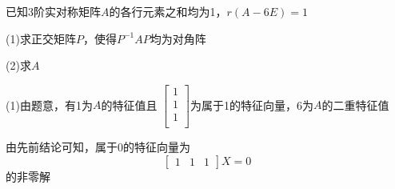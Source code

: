\documentclass[lang=cn,10pt]{elegantbook}
\begin{document}
\begin{example}
	已知3阶实对称矩阵$A $的各行元素之和均为1，$r(A-6E)=1$
	
	(1)求正交矩阵$P$，使得$P^{-1}AP$均为对角阵
	
	(2)求$A$
\end{example}
\begin{solution}
	
	(1)由题意，有1为$A$的特征值且
	$\left[ \begin{array}{c}
		1\\
		1\\
		1\\
	\end{array} \right]$为属于1的特征向量，6为$A$的二重特征值
	
	由先前结论可知，属于0的特征向量为
	\begin{equation*}
		\begin{bmatrix}
			1& 1 &1
		\end{bmatrix}X=0
	\end{equation*}
	的非零解
	

\end{solution}
\end{document}
